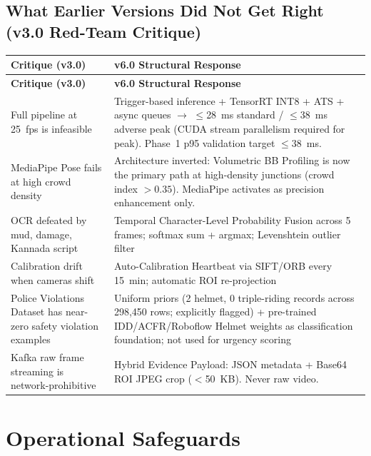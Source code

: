 \documentclass[11pt,a4paper]{article}
\begin{document}
\subsection*{What Earlier Versions Did Not Get Right (v3.0 Red-Team Critique)}

\begin{longtable}{L{6cm} L{9cm}}
    \toprule
    \color{white}\textbf{Critique (v3.0)} & \color{white}\textbf{v6.0 Structural Response} \\
    \midrule
    \endfirsthead
    \toprule
    \color{white}\textbf{Critique (v3.0)} & \color{white}\textbf{v6.0 Structural Response} \\
    \midrule
    \endhead
    \bottomrule
    \endfoot

    Full pipeline at 25~fps is infeasible & Trigger-based inference + TensorRT INT8 + ATS + async queues $\rightarrow$ $\leq$28~ms standard / $\leq$38~ms adverse peak (CUDA stream parallelism required for peak). Phase~1 p95 validation target $\leq 38$~ms. \\
    MediaPipe Pose fails at high crowd density & Architecture inverted: Volumetric BB Profiling is now the primary path at high-density junctions (crowd index $> 0.35$). MediaPipe activates as precision enhancement only. \\
    OCR defeated by mud, damage, Kannada script & Temporal Character-Level Probability Fusion across 5 frames; softmax sum + argmax; Levenshtein outlier filter \\
    Calibration drift when cameras shift & Auto-Calibration Heartbeat via SIFT/ORB every 15~min; automatic ROI re-projection \\
    Police Violations Dataset has near-zero safety violation examples & Uniform priors (2 helmet, 0 triple-riding records across 298,450 rows; explicitly flagged) + pre-trained IDD/ACFR/Roboflow Helmet weights as classification foundation; not used for urgency scoring \\
    Kafka raw frame streaming is network-prohibitive & Hybrid Evidence Payload: JSON metadata + Base64 ROI JPEG crop ($<$50~KB). Never raw video. \\
\end{longtable}

\section{Operational Safeguards}
\end{document}
